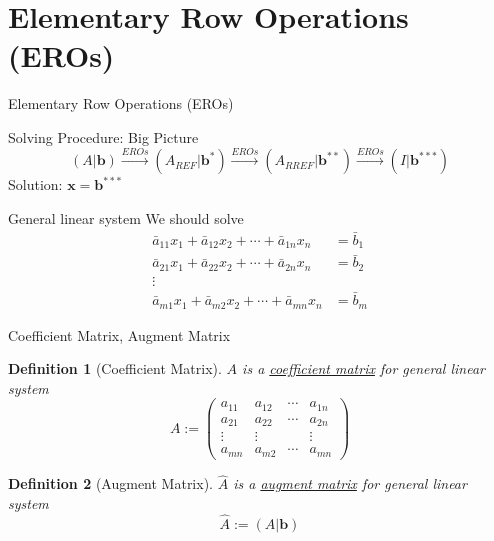 \documentclass[final]{beamer}
\newtheorem{defn}{Definition}
\begin{document}
\section{Elementary Row Operations (EROs)} %
\label{sec:elementary_row_operations_eros}
\begin{frame}[t]{Elementary Row Operations (EROs)}
	\begin{block}
		{Solving Procedure: Big Picture}
		\[
			(A\vert \mathbf{b}) \xrightarrow{EROs} (A_{REF}\vert \mathbf{b}^\ast) \xrightarrow{EROs} (A_{RREF}\vert \mathbf{b}^{\ast\ast}) \xrightarrow{EROs} (I|\mathbf{b}^{\ast\ast\ast})
		\]
		Solution: $\mathbf{x} = \mathbf{b}^{\ast\ast\ast}$
	\end{block}
	\begin{block}
		{General linear system} We should solve 
		\begin{align*}
			\bar a_{11} x_1 + \bar a_{12}x_2 + \cdots + \bar a_{1n}x_n &= \bar b_1\\
			\bar a_{21} x_1 + \bar a_{22}x_2 + \cdots + \bar a_{2n}x_n &= \bar b_2\\
			\vdots\\
			\bar a_{m1} x_1 + \bar a_{m2}x_2 + \cdots + \bar a_{mn}x_n &= \bar b_m
		\end{align*}
	\end{block}
\end{frame}
\begin{frame}[t]{Coefficient Matrix, Augment Matrix}
	\begin{defn}
		[Coefficient Matrix]
		$A$ is a \uline{coefficient matrix} for general linear system
		\[
			A := \begin{pmatrix}
				a_{11}&a_{12}&\cdots& a_{1n}\\
				a_{21}&a_{22}&\cdots& a_{2n}\\
				\vdots&\vdots&&\vdots\\
				a_{mn}&a_{m2}&\cdots& a_{mn}
			\end{pmatrix}
		\]
	\end{defn}
	\begin{defn}
		[Augment Matrix]
		$\hat A$ is a \uline{augment matrix} for general linear system
		\[
			\hat A := (A\vert \mathbf{b}) 
		\]
	\end{defn}
\end{frame}
\end{document}

